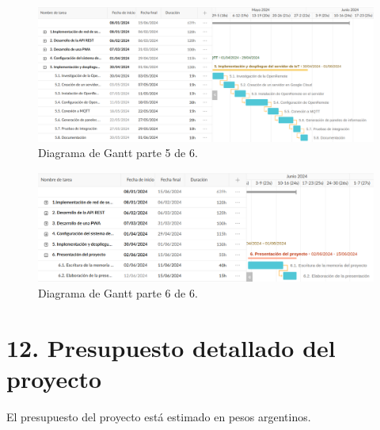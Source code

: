 \documentclass[
11pt, %
]{charter}
\begin{document}
\begin{figure}[htpb]
\centering 
\includegraphics[width=1.1\textwidth]{./Figuras/diagrama_gantt_5.png}
\caption{Diagrama de Gantt parte 5 de 6.}
\label{fig:diagGrantt5}
\end{figure}
\vspace{5px}

\begin{figure}[htpb]
\centering 
\includegraphics[width=1.1\textwidth]{./Figuras/diagrama_gantt_6.png}
\caption{Diagrama de Gantt parte 6 de 6.}
\label{fig:diagGrantt6}
\end{figure}
\vspace{5px}

\section{12. Presupuesto detallado del proyecto}
\label{sec:presupuesto}

El presupuesto del proyecto está estimado en pesos argentinos.
\end{document}
